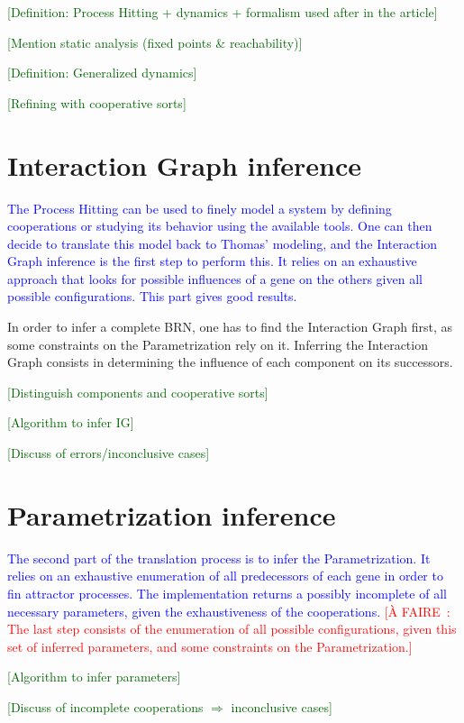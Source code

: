 \documentclass[fleqn]{llncs}
\newcommand{\afaire}[1]{\textcolor{red}{[À FAIRE~: #1]}}
\newcommand{\resume}[1]{\textcolor{blue}{#1}}
\newcommand{\todo}[1]{\textcolor{darkgreen}{[#1]}}
\begin{document}
\todo{Definition: Process Hitting + dynamics + formalism used after in the article}

\todo{Mention static analysis (fixed points \& reachability)}

\todo{Definition: Generalized dynamics}

\todo{Refining with cooperative sorts}



\section{Interaction Graph inference}
\resume{The Process Hitting can be used to finely model a system by defining cooperations or studying its behavior using the available tools. One can then decide to translate this model back to Thomas' modeling, and the Interaction Graph inference is the first step to perform this. It relies on an exhaustive approach that looks for possible influences of a gene on the others given all possible configurations. This part gives good results.}

In order to infer a complete BRN, one has to find the Interaction Graph first, as some constraints on the Parametrization rely on it. Inferring the Interaction Graph consists in determining the influence of each component on its successors.

\todo{Distinguish components and cooperative sorts}

\todo{Algorithm to infer IG}

\todo{Discuss of errors/inconclusive cases}



\section{Parametrization inference}
\resume{The second part of the translation process is to infer the Parametrization. It relies on an exhaustive enumeration of all predecessors of each gene in order to fin attractor processes. The implementation returns a possibly incomplete of all necessary parameters, given the exhaustiveness of the cooperations.} \afaire{The last step consists of the enumeration of all possible configurations, given this set of inferred parameters, and some constraints on the Parametrization.}

\todo{Algorithm to infer parameters}

\todo{Discuss of incomplete cooperations $\Rightarrow$ inconclusive cases}
\end{document}
